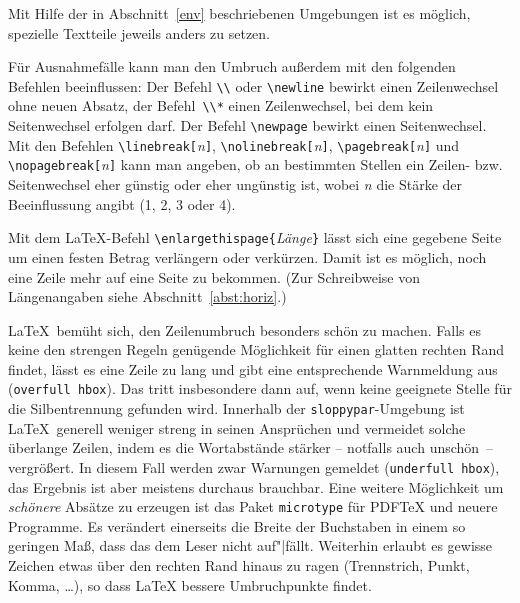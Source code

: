 Mit Hilfe der in Abschnitt~\ref{env} beschriebenen Umgebungen ist
es möglich, spezielle Textteile jeweils anders zu setzen.
 
Für Ausnahmefälle kann man den Umbruch außerdem mit den
folgenden Befehlen beeinflussen:
Der Befehl \lstinline|\\| oder \lstinline|\newline| bewirkt einen
Zeilenwechsel ohne neuen Absatz, der Befehl~\lstinline|\\*| einen
Zeilenwechsel, bei dem kein Seitenwechsel erfolgen darf.
Der Befehl \lstinline|\newpage| bewirkt einen Seitenwechsel.
Mit den Befehlen
\lstinline|\linebreak[|\textit{n}\lstinline|]|,
\lstinline|\nolinebreak[|\textit{n}\lstinline|]|,
\lstinline|\pagebreak[|\textit{n}\lstinline|]|   und
\lstinline|\nopagebreak[|\textit{n}\lstinline|]|
kann man angeben, ob an bestimmten Stellen ein Zeilen- bzw.\ %
Seitenwechsel eher günstig oder eher ungünstig ist, wobei
\textit{n} die Stärke der Beeinflussung angibt (1, 2, 3 oder 4).

Mit dem \LaTeX-Befehl \lstinline:\enlargethispage{:\textit{Länge}\lstinline:}:
lässt sich eine gegebene Seite um einen festen Betrag
verlängern oder verkürzen. Damit ist es möglich, noch
eine Zeile mehr auf eine Seite zu bekommen. 
(Zur Schreibweise von Längenangaben siehe Abschnitt~\ref{abst:horiz}.)
 

\LaTeX\ bemüht sich, den Zeilenumbruch besonders schön zu machen.  Falls es
keine den strengen Regeln genügende Möglichkeit für einen glatten rechten Rand
findet, lässt es eine Zeile zu lang und gibt eine entsprechende Warnmeldung
aus (\texttt{over\-full hbox}). Das tritt insbesondere dann auf, wenn keine
geeignete Stelle für die Silbentrennung gefunden wird. Innerhalb der
\texttt{sloppypar}-Umgebung ist \LaTeX\ generell weniger streng in seinen
Ansprüchen und vermeidet solche überlange Zeilen, indem es die Wortabstände
stärker -- notfalls auch unschön~-- vergrößert. In diesem Fall werden zwar
Warnungen gemeldet (\texttt{under\-full hbox}), das Ergebnis ist aber meistens
durchaus brauchbar. Eine weitere Möglichkeit um \textit{schönere}  Absätze zu
erzeugen ist das Paket \texttt{microtype} für PDF\TeX{} und neuere Programme.
Es verändert einerseits die Breite der Buchstaben in einem so geringen Maß,
dass das dem Leser nicht auf"|fällt. Weiterhin erlaubt es gewisse Zeichen
etwas über den rechten Rand hinaus zu ragen (Trennstrich, Punkt, Komma,
\dots), so dass \LaTeX{} bessere Umbruchpunkte findet.


